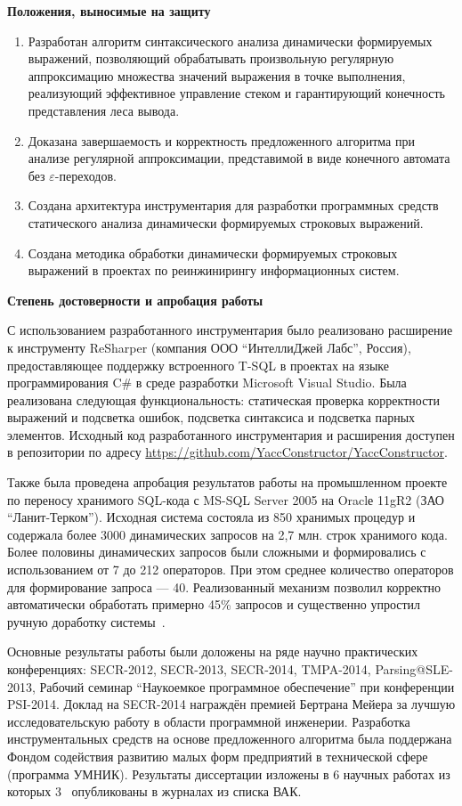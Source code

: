 \textbf{Положения, выносимые на защиту}
\begin{enumerate}
    \item Разработан алгоритм синтаксического анализа динамически формируемых выражений, позволяющий обрабатывать произвольную регулярную аппроксимацию множества значений выражения в точке выполнения, реализующий эффективное управление стеком и гарантирующий конечность представления леса вывода. 
    \item Доказана завершаемость и корректность предложенного алгоритма при анализе регулярной аппроксимации, представимой в виде конечного автомата без $\varepsilon$-переходов.
    \item Создана архитектура инструментария для разработки программных средств статического анализа динамически формируемых строковых выражений.
    \item Создана методика обработки динамически формируемых строковых выражений в проектах по реинжинирингу информационных систем.
\end{enumerate}


\textbf{Степень достоверности и апробация работы}

С использованием разработанного инструментария было реализовано расширение к инструменту ReSharper (компания ООО ``ИнтеллиДжей Лабс'', Россия), предоставляющее поддержку встроенного T-SQL в проектах на языке программирования C\# в среде разработки Microsoft Visual Studio. Была реализована следующая функциональность: статическая проверка корректности выражений и подсветка ошибок, подсветка синтаксиса и подсветка парных элементов. Исходный код разработанного инструментария и расширения доступен в репозитории по адресу \url{https://github.com/YaccConstructor/YaccConstructor}.

Также была проведена апробация результатов работы на промышленном проекте по переносу хранимого SQL-кода с MS-SQL Server 2005 на Oraclе 11gR2 (ЗАО ``Ланит-Терком''). Исходная система состояла из 850 хранимых процедур и содержала более 3000 динамических запросов на 2,7 млн. строк хранимого кода. Более половины динамических запросов были сложными и формировались с использованием от 7 до 212 операторов. При этом среднее количество операторов для формирование запроса --- 40. Реализованный механизм позволил корректно автоматически обработать примерно 45\% запросов и существенно упростил ручную доработку системы~\cite{Syrcose}.

Основные результаты работы были доложены на ряде научно практических конференциях: SECR-2012, SECR-2013, SECR-2014, TMPA-2014, Parsing@SLE-2013, Рабочий семинар ``Наукоемкое программное обеспечение'' при конференции PSI-2014. Доклад на SECR-2014 награждён премией Бертрана Мейера за лучшую исследовательскую работу в области программной инженерии. Разработка инструментальных средств на основе предложенного алгоритма была поддержана Фондом содействия развитию малых форм предприятий в технической сфере (программа УМНИК). Результаты диссертации изложены в 6 научных работах из которых 3~\cite{YCArticle,SELforIDEru,AbstractGLL} опубликованы в журналах из списка ВАК.%

